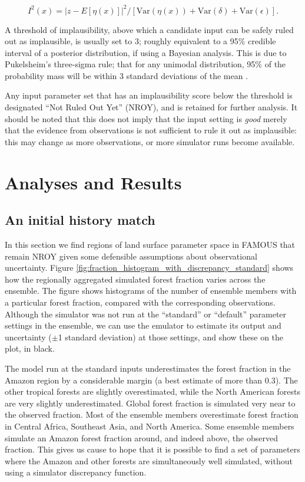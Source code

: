 \documentclass[esd, article]{copernicus} %
\begin{document}
\begin{equation}\label{eq:implausibility}
I^{2}(x)=  |z -E[\eta(x)]|^{2} / [\textrm{Var}(\eta(x)) +\textrm{Var}(\delta) +\textrm{Var}(\epsilon)].
\end{equation}

A threshold of implausibility, above which a candidate input can be safely ruled out as implausible, is usually set to 3; roughly equivalent to a 95\% credible interval of a posterior distribution, if using a Bayesian analysis. This is due to Pukelsheim's three-sigma rule; that for any unimodal distribution, 95\% of the probability mass will be within 3 standard deviations of the mean \citep{pukelsheim1994three}.

Any input parameter set that has an implausibility score below the threshold is designated ``Not Ruled Out Yet'' (NROY), and is retained for further analysis. It should be noted that this does not imply that the input setting is \emph{good} merely that the evidence from observations is not sufficient to rule it out as implausible: this may change as more observations, or more simulator runs become available.

\section{Analyses and Results}\label{AnalysesandResults}

\subsection{An initial history match}\label{ssec:initialhistorymatch}
In this section we find regions of land surface parameter space in FAMOUS that remain NROY given some defensible assumptions about observational uncertainty.  Figure \ref{fig:fraction_histogram_with_discrepancy_standard} shows how the regionally aggregated simulated forest fraction varies across the ensemble. The figure shows histograms of the number of ensemble members with a particular forest fraction, compared with the corresponding observations. Although the simulator was not run at the ``standard'' or ``default'' parameter settings in the ensemble, we can use the emulator to estimate its output and uncertainty ($\pm$1 standard deviation) at those settings, and show these on the plot, in black.

The model run at the standard inputs underestimates the forest fraction in the Amazon region by a considerable margin (a best estimate of more than 0.3). The other tropical forests are slightly overestimated, while the North American forests are very slightly underestimated. Global forest fraction is simulated very near to the observed fraction. Most of the ensemble members overestimate forest fraction in Central Africa, Southeast Asia, and North America. Some ensemble members simulate an Amazon forest fraction around, and indeed above, the observed fraction. This gives us cause to hope that it is possible to find a set of parameters where the Amazon and other forests are simultaneously well simulated, without using a simulator discrepancy function. 
\end{document}
